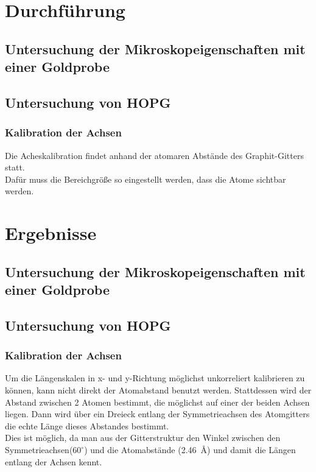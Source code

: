 \documentclass[12pt,a4paper]{article}
\begin{document}
\section{Durchführung}
\subsection{Untersuchung der Mikroskopeigenschaften mit einer Goldprobe}
\subsection{Untersuchung von HOPG}

\subsubsection{Kalibration der Achsen}
Die Acheskalibration findet anhand der atomaren Abstände des Graphit-Gitters statt.\\
Dafür muss die Bereichgröße so eingestellt werden, dass die Atome sichtbar werden.

\section{Ergebnisse}
\subsection{Untersuchung der Mikroskopeigenschaften mit einer Goldprobe}

\subsection{Untersuchung von HOPG}
\subsubsection{Kalibration der Achsen}
Um die Längenskalen in x- und y-Richtung möglichst unkorreliert kalibrieren zu können, kann nicht direkt der Atomabstand benutzt werden. Stattdessen wird der Abstand zwischen 2 Atomen bestimmt, die möglichst auf einer der beiden Achsen liegen. Dann wird über ein Dreieck entlang der Symmetrieachsen des Atomgitters die echte Länge dieses Abstandes bestimmt.\\
Dies ist möglich, da man aus der Gitterstruktur den Winkel zwischen den Symmetrieachsen($60^{\circ}$) und die Atomabstände (\SI{2.46}{\angstrom}) und damit die Längen entlang der Achsen kennt.
\end{document}
